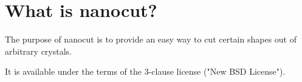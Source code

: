 \section{What is nanocut?}

The purpose of nanocut is to provide an easy way to cut certain shapes out of arbitrary crystals.

It is available under the terms of the 3-clause license ("New BSD License").